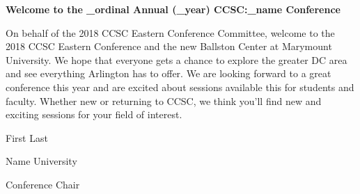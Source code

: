 \documentclass{article}
\begin{document}
\begingroup
  \centering
  \textbf{\LARGE Welcome to the \conf_ordinal Annual (\conf_year)
  CCSC:\conf_name Conference}\\
\endgroup

\vspace{10pt}

On behalf of the 2018 CCSC Eastern Conference Committee, welcome to the 2018
CCSC Eastern Conference and the new Ballston Center at Marymount University.
We hope that everyone gets a chance to explore the greater DC area and see
everything Arlington has to offer. We are looking forward to a great conference
this year and are excited about sessions available this for students and
faculty. Whether new or returning to CCSC, we think you’ll find new and
exciting sessions for your field of interest.

\vspace{10pt}

\hfill First Last

\hfill Name University

\hfill Conference Chair
\end{document}
